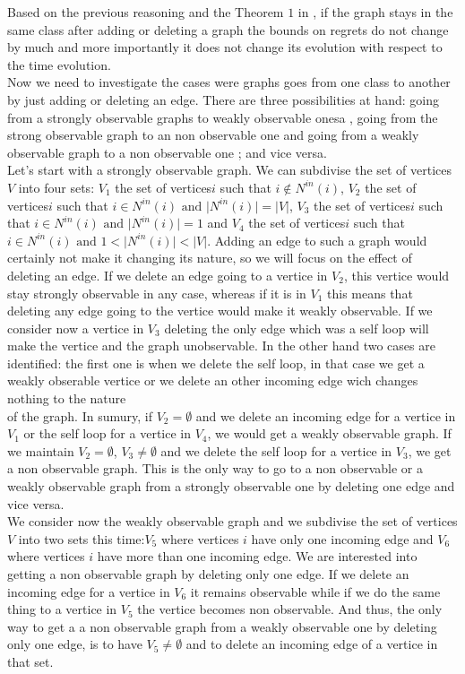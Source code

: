 \documentclass{article} %
\begin{document}
Based on the previous reasoning and the Theorem $1$ in \cite{journals/corr/AlonCDK15}, if the graph stays in the same class after adding or deleting a graph the bounds on regrets do not change by much and more importantly it does not change its evolution with respect to the time evolution.\\

Now we need to investigate the cases were graphs goes from one class to another by just adding or deleting an edge. There are three possibilities at hand: going from a strongly observable graphs to weakly observable onesa , going from the strong observable graph to an non observable one and going from a weakly observable graph to a non observable one ; and vice versa.\\

 Let's start with a strongly observable graph. We can subdivise the set of vertices $V$  into four sets: $V_1$ the set of vertices$i$ such that  $i \notin N^{in}(i)$, $V_2$ the set of vertices$i$ such that  $i \in N^{in}(i) \text{ and } \vert N^{in}(i)\vert=\vert V \vert$, $V_3$ the set of vertices$i$ such that  $i \in N^{in}(i) \text{ and } \vert N^{in}(i)\vert=1$ and $V_4$ the set of vertices$i$ such that  $i \in N^{in}(i) \text{ and } 1<\vert N^{in}(i)\vert<\vert V \vert$. Adding an edge to such a graph would certainly not make it changing its nature, so we will focus on the effect of deleting an edge. If we delete an edge going to a vertice in $V_2$, this vertice would stay strongly observable in any case, whereas if it is in $V_1$ this means that deleting any edge going to the vertice would make it weakly observable. If we consider now a vertice in $V_3$ deleting the only edge which was a self loop will make the vertice and the graph unobservable. In the other hand two cases are identified: the first one is when we delete the self loop, in that case we get a weakly obserable vertice or we delete an other incoming edge wich changes nothing to the nature\\
  of the graph. In sumury, if $V_2= \emptyset$ and we delete an incoming edge for a vertice in $V_1$ or the self loop for a vertice in $V_4$, we would get a weakly observable graph. If we maintain  $V_2= \emptyset$, $V_3 \neq \emptyset$ and we delete the self loop for a vertice in $V_3$, we get a non observable graph. This is the only way to go to a non observable or a weakly observable graph from a strongly observable one by deleting one edge and vice versa.\\
  
  We consider now the weakly observable graph and we subdivise the set of vertices $V$ into two sets this time:$V_5$ where vertices $i$ have only one incoming edge and $V_6$ where vertices $i$ have more than one incoming edge. We are interested into getting a non observable graph by deleting only one edge. If we delete an incoming edge for a vertice in $V_6$ it remains observable while if we do the same thing to a vertice in $V_5$ the vertice becomes non observable. And thus, the only way to get a a non observable graph from a weakly observable one by deleting only one edge, is to have $V_5 \neq \emptyset$ and to delete an incoming edge of a vertice in that set.\\
  
\end{document}
